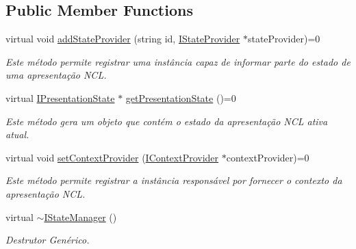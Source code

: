\subsection*{Public Member Functions}
\begin{DoxyCompactItemize}
\item 
virtual void \hyperlink{classbr_1_1ufscar_1_1lince_1_1ginga_1_1wac_1_1state_1_1IStateManager_a739db8ceb6f56a110aa46bd272ea0956}{addStateProvider} (string id, \hyperlink{classbr_1_1ufscar_1_1lince_1_1ginga_1_1wac_1_1state_1_1IStateProvider}{IStateProvider} $\ast$stateProvider)=0
\begin{DoxyCompactList}\small\item\em Este método permite registrar uma instância capaz de informar parte do estado de uma apresentação NCL. \item\end{DoxyCompactList}\item 
virtual \hyperlink{classbr_1_1ufscar_1_1lince_1_1ginga_1_1wac_1_1state_1_1IPresentationState}{IPresentationState} $\ast$ \hyperlink{classbr_1_1ufscar_1_1lince_1_1ginga_1_1wac_1_1state_1_1IStateManager_a8fe894ac51f00b4d3633d93135678e0c}{getPresentationState} ()=0
\begin{DoxyCompactList}\small\item\em Este método gera um objeto que contém o estado da apresentação NCL ativa atual. \item\end{DoxyCompactList}\item 
virtual void \hyperlink{classbr_1_1ufscar_1_1lince_1_1ginga_1_1wac_1_1state_1_1IStateManager_a3e9493dcb1e1dbfd6171252fb2edca8d}{setContextProvider} (\hyperlink{classbr_1_1ufscar_1_1lince_1_1ginga_1_1wac_1_1state_1_1IContextProvider}{IContextProvider} $\ast$contextProvider)=0
\begin{DoxyCompactList}\small\item\em Este método permite registrar a instância responsável por fornecer o contexto da apresentação NCL. \item\end{DoxyCompactList}\item 
virtual \hyperlink{classbr_1_1ufscar_1_1lince_1_1ginga_1_1wac_1_1state_1_1IStateManager_afde1134f339b28a3a262f3df65857cc1}{$\sim$IStateManager} ()
\begin{DoxyCompactList}\small\item\em Destrutor Genérico. \item\end{DoxyCompactList}\end{DoxyCompactItemize}


